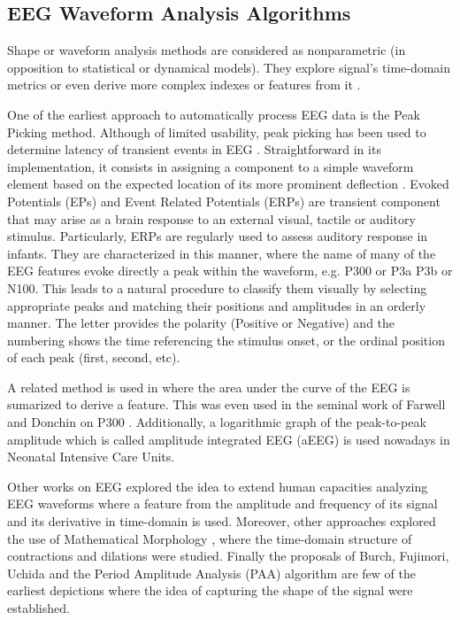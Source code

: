 \documentclass[brainsci,article,submit,moreauthors,pdftex,10pt,a4paper]{mdpi}
\begin{document}
\subsection{EEG Waveform Analysis Algorithms}
\label{Algorithms}

Shape or waveform analysis methods are considered as nonparametric (in opposition to statistical or dynamical models).  They explore signal's time-domain metrics or even derive more complex indexes or features from it \citep{Thakor2009}. 

One of the earliest approach to automatically process EEG data is the Peak Picking method.  Although of limited usability, peak picking has been used to determine latency of transient events in EEG \citep{Jaskowski2000,Zhang2011}.  Straightforward in its implementation, it consists in assigning a component to a simple waveform element based on the expected location of its more prominent deflection \citep{Ouyang2017}.  Evoked Potentials (EPs) and Event Related Potentials (ERPs) are transient component that may arise as a brain response to an external visual, tactile or auditory stimulus.  Particularly, ERPs are regularly used to assess auditory response in infants. They are characterized in this manner, where the name of many of the EEG features evoke directly a peak within the waveform, e.g. P300 or P3a P3b or N100.  This leads to a natural procedure to classify them visually by selecting appropriate peaks and matching their positions and amplitudes in an orderly manner.  The letter provides the polarity (Positive or Negative) and the numbering shows the time referencing the stimulus onset, or the ordinal position of each peak (first, second, etc).   

A related method is used in \citep{Alvarado-Gonzalez2016} where the area under the curve of the EEG is sumarized to derive a feature.  This was even used in the seminal work of Farwell and Donchin on P300 \citep{Farwell1988,WolpawJonathanR2012}. Additionally, a logarithmic graph of the peak-to-peak amplitude which is called amplitude integrated EEG (aEEG) \citep{Shah2015} is used nowadays in Neonatal Intensive Care Units.

Other works on EEG explored the idea to extend human capacities analyzing EEG waveforms \citep{Klein1976} where a feature from the amplitude and frequency of its signal and its derivative in time-domain is used.  Moreover, other approaches explored the use of Mathematical Morphology \citep{Yamaguchi2009}, where the time-domain structure of contractions and dilations were studied. Finally the proposals of Burch, Fujimori, Uchida and the Period Amplitude Analysis (PAA) \citep{Uchida1996} algorithm are few of the earliest depictions where the idea of capturing the shape of the signal were established.
\end{document}
